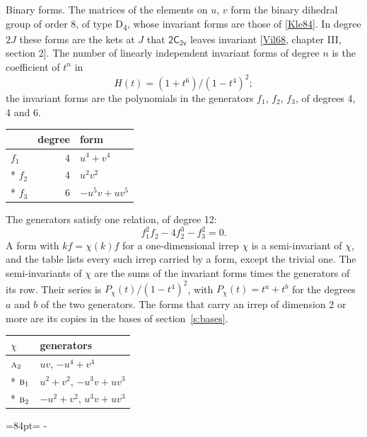 \documentclass[10pt,a4paper]{article}
\makeatletter
\renewcommand\paragraph{\@startsection{paragraph}{4}{\z@}{1.5ex plus .5ex minus .2ex}{-1em}%
  {\normalfont\small\sffamily\bfseries\color{parttitle}}}
\newcommand{\needspace}[1]{\par\penalty-100\begingroup\dimen0=#1\relax\dimen2=\pagegoal
  \advance\dimen2-\pagetotal\ifdim\dimen0>\dimen2\relax\ifdim\dimen2>0pt\vfil\break\fi\fi
  \endgroup}
\numberwithin{equation}{section}
\newcommand{\grp}[1]{\mathsf{#1}}
\newcommand{\irr}[1]{\text{\normalfont\scshape #1}}
\makeatother
\begin{document}
\paragraph{Binary forms.}
The matrices of the elements on $u$, $v$ form the binary dihedral group of order 8, of type D\textsubscript{4}, whose invariant forms are those of [\href{../../../REFERENCES.pdf\#ref.Kle84}{Kle84}]. In degree $2J$ these forms are the kets at $J$ that $\grp{2C_{2v}}$ leaves invariant [\href{../../../REFERENCES.pdf\#ref.Vil68}{Vil68}, chapter III, section 2]. \label{n:head.degree}\label{n:head.form}The number of linearly independent invariant forms of degree $n$ is the coefficient of $t^n$ in
\begin{equation}\label{e:molien}H(t) = (1 + t^{6})/(1-t^{4})^{2};\end{equation}
the invariant forms are the polynomials in the generators $f_1$, $f_2$, $f_3$, of degrees 4, 4 and 6.
{\small\begin{longtable}{@{}lrl@{}}\toprule
& degree & form\\\midrule\endhead
\bottomrule\endfoot\endlastfoot
$f_{1}$ & 4 & $u^{4} + v^{4}$\\*
$f_{2}$ & 4 & $u^{2}v^{2}$\\*
$f_{3}$ & 6 & $-u^{5}v + uv^{5}$\\
\bottomrule\end{longtable}}
The generators satisfy one relation, of degree 12:
\begin{equation}\label{e:relation}f_{1}^{2}f_{2} - 4f_{2}^{3} - f_{3}^{2} = 0.\end{equation}
A form with $k f = \chi(k) f$ for a one-dimensional irrep $\chi$ is a semi-invariant of $\chi$, and the table lists every such irrep carried by a form, except the trivial one. \label{n:head.generators}The semi-invariants of $\chi$ are the sums of the invariant forms times the generators of its row. Their series is $P_\chi(t)/(1-t^{4})^{2}$, with $P_\chi(t) = t^{a} + t^{b}$ for the degrees $a$ and $b$ of the two generators. The forms that carry an irrep of dimension 2 or more are its copies in the bases of section~\ref{s:bases}.
{\small\begin{longtable}{@{}ll@{}}\toprule
$\chi$ & generators\\\midrule\endhead
\bottomrule\endfoot\endlastfoot
$\irr{a}_{2}$ & $uv$, $-u^{4} + v^{4}$\\*
$\irr{b}_{1}$ & $u^{2} + v^{2}$, $-u^{3}v + uv^{3}$\\*
$\irr{b}_{2}$ & $-u^{2} + v^{2}$, $u^{3}v + uv^{3}$\\
\bottomrule\end{longtable}}
\needspace{84pt}
\end{document}
